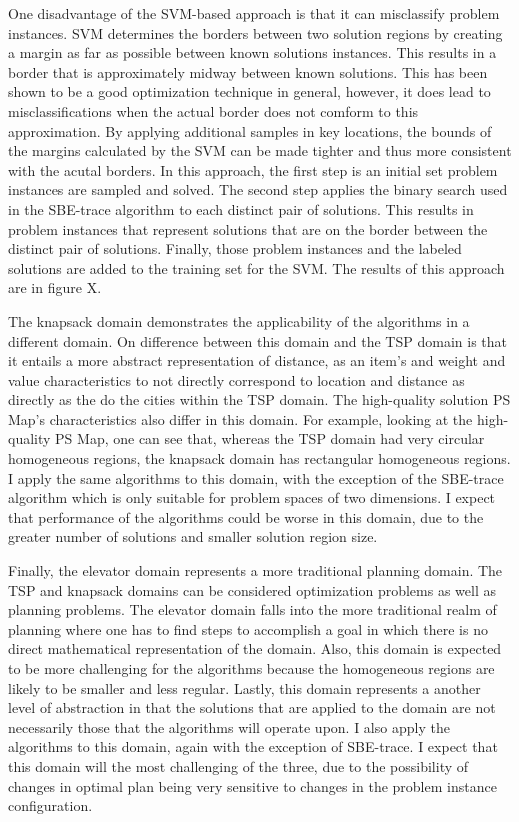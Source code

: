 \documentclass[12pt]{report}
\begin{document}
One disadvantage of the SVM-based approach is that it can misclassify problem instances.  SVM determines the borders between two solution regions by creating a margin as far as possible between known solutions instances.  This results in a border that is approximately midway between known solutions.  This has been shown to be a good optimization technique in general, however, it does lead to misclassifications when the actual border does not comform to this approximation.  By applying additional samples in key locations, the bounds of the margins calculated by the SVM can be made tighter and thus more consistent with the acutal borders.  In this approach, the first step is an initial set problem instances are sampled and solved. The second step applies the binary search used in the SBE-trace algorithm to each distinct pair of solutions.  This results in problem instances that represent solutions that are on the border between the distinct pair of solutions.  Finally, those problem instances and the labeled solutions are added to the training set for the SVM. The results of this approach are in figure X. 



The knapsack domain demonstrates the applicability of the algorithms in a different domain.  On difference between this domain and the TSP domain is that it entails a more abstract representation of distance, as an item's  and weight and value characteristics to not directly correspond to location and  distance as directly as the do the cities within the TSP domain. The high-quality solution PS Map's characteristics also differ in this domain.  For example, looking at the high-quality PS Map, one can see that, whereas the TSP domain had very circular homogeneous regions, the knapsack domain has rectangular homogeneous regions.  I apply the same algorithms to this domain, with the exception of the SBE-trace algorithm which is only suitable for problem spaces of two dimensions.  I expect that performance of the algorithms could be worse in this domain, due to the greater number of solutions and smaller solution region size.


Finally, the elevator domain represents a more traditional planning domain.  The TSP and knapsack domains can be considered optimization problems as well as planning problems.  The elevator domain  falls into the more traditional realm of planning where one has to find steps to accomplish a goal in which there is no direct mathematical representation of the domain.  Also, this domain is expected to be more challenging for the algorithms because the homogeneous regions are likely to be smaller and less regular.  Lastly, this domain represents a another level of abstraction in that the solutions that are applied to the domain are not necessarily those that the algorithms will operate upon.  I also apply the algorithms to this domain, again with the exception of SBE-trace.  I expect that this domain will the most challenging of the three, due to the possibility of changes in optimal plan being very sensitive to changes in the problem instance configuration.
\end{document}
